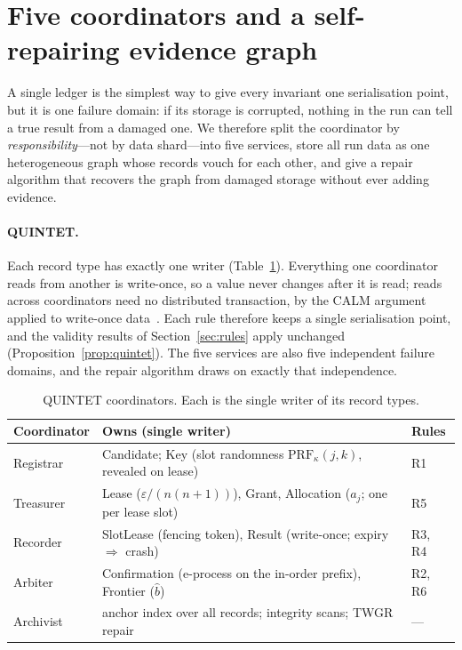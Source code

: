 \documentclass[pdflatex,sn-mathphys-num]{sn-jnl}
\theoremstyle{thmstyleone}
\theoremstyle{thmstyletwo}
\theoremstyle{thmstylethree}
\newcommand{\bhat}{\hat b}
\begin{document}
\section{Five coordinators and a self-repairing evidence graph}\label{sec:quintet}

A single ledger is the simplest way to give every invariant one serialisation point, but it is one failure domain: if its storage is corrupted, nothing in the run can tell a true result from a damaged one. We therefore split the coordinator by \emph{responsibility}---not by data shard---into five services, store all run data as one heterogeneous graph whose records vouch for each other, and give a repair algorithm that recovers the graph from damaged storage without ever adding evidence.

\paragraph{QUINTET.} Each record type has exactly one writer (Table~\ref{tab:quintet}). Everything one coordinator reads from another is write-once, so a value never changes after it is read; reads across coordinators need no distributed transaction, by the CALM argument applied to write-once data~\cite{hellerstein2020calm}. Each rule therefore keeps a single serialisation point, and the validity results of Section~\ref{sec:rules} apply unchanged (Proposition~\ref{prop:quintet}). The five services are also five independent failure domains, and the repair algorithm draws on exactly that independence.

\begin{table}[!htbp]\centering\small
\caption{QUINTET coordinators. Each is the single writer of its record types.}\label{tab:quintet}
\begin{tabularx}{\linewidth}{lXl}
\toprule
Coordinator & Owns (single writer) & Rules \\\midrule
Registrar & Candidate; Key (slot randomness $\mathrm{PRF}_\kappa(j,k)$, revealed on lease) & R1 \\
Treasurer & Lease ($\varepsilon/(n(n+1))$), Grant, Allocation ($a_j$; one per lease slot) & R5 \\
Recorder & SlotLease (fencing token), Result (write-once; expiry $\Rightarrow$ crash) & R3, R4 \\
Arbiter & Confirmation (e-process on the in-order prefix), Frontier ($\bhat$) & R2, R6 \\
Archivist & anchor index over all records; integrity scans; TWGR repair & --- \\
\bottomrule\end{tabularx}
\end{table}
\end{document}
